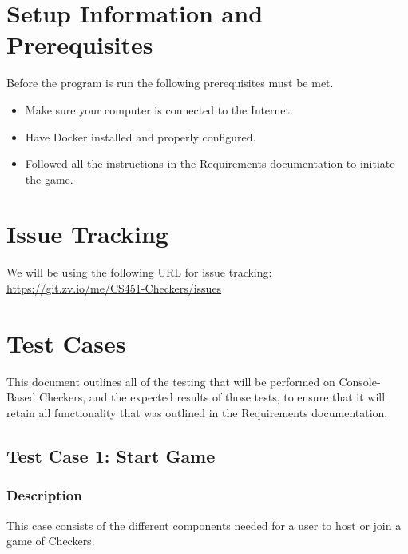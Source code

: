 \documentclass[letterpaper]{article}
\begin{document}
\section{Setup Information and Prerequisites}
\label{sec:setup}

Before the program is run the following prerequisites must be met.

\begin{itemize}
    \item Make sure your computer is connected to the Internet.
    \item Have Docker installed and properly configured.
    \item Followed all the instructions in the Requirements
    	  documentation to initiate the game.
\end{itemize}


\section{Issue Tracking }
\label{sec:issue}

We will be using the following URL for issue tracking:\\
\url{https://git.zv.io/me/CS451-Checkers/issues}


\newpage

\section{Test Cases}
\label{sec:test}

This document outlines all of the testing that will be performed
on Console-Based Checkers, and the expected results of those tests,
to ensure that it will retain all functionality that was outlined
in the Requirements documentation.

\subsection{Test Case 1: Start Game}
\label{sec:test_start}

\subsubsection{Description}
\label{sec:test_start_des}
This case consists of the different components needed for a user to host or join a 
game of Checkers.
\end{document}

